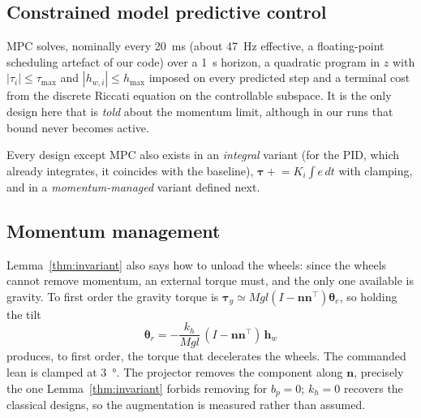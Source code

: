 \documentclass[conference]{IEEEtran}
\theoremstyle{definition}
\theoremstyle{plain}
\newcommand{\btau}{\boldsymbol{\tau}}
\newcommand{\bh}{\boldsymbol{h}}
\newcommand{\bn}{\boldsymbol{n}}
\newcommand{\btheta}{\boldsymbol{\theta}}
\begin{document}
\subsection{Constrained model predictive control}

MPC solves, nominally every \SI{20}{\milli\second} (about \SI{47}{\hertz}
effective, a floating-point scheduling artefact of our code) over a
\SI{1}{\second} horizon, a quadratic
program in $z$ with $|\tau_i|\le\tau_{\max}$ and $|h_{w,i}|\le h_{\max}$ imposed
on every predicted step and a terminal cost from the discrete Riccati equation
on the controllable subspace. It is the only design here that is \emph{told}
about the momentum limit, although in our runs that bound never becomes active.

Every design except MPC also exists in an \emph{integral} variant (for the PID,
which already integrates, it coincides with the baseline),
$\btau\mathrel{+}=K_i\!\int\!e\,dt$ with clamping, and in a
\emph{momentum-managed} variant defined next.
\subsection{Momentum management}
\label{sec:mm}

Lemma~\ref{thm:invariant} also says how to unload the wheels: since the
wheels cannot remove momentum, an external torque must, and the only one
available is gravity. To first order the gravity torque is
$\btau_g\simeq Mgl(I-\bn\bn^{\!\top})\btheta_e$, so holding the tilt
\begin{equation}
\btheta_r = -\frac{k_h}{Mgl}\,(I-\bn\bn^{\!\top})\,\bh_w
\label{eq:mm}
\end{equation}
produces, to first order, the torque that decelerates the wheels. The commanded lean is clamped at
\SI{3}{\degree}. The projector removes the
component along $\bn$, precisely the one Lemma~\ref{thm:invariant} forbids
removing for $b_p=0$; $k_h=0$ recovers the classical designs, so the augmentation is
measured rather than assumed.
\end{document}
